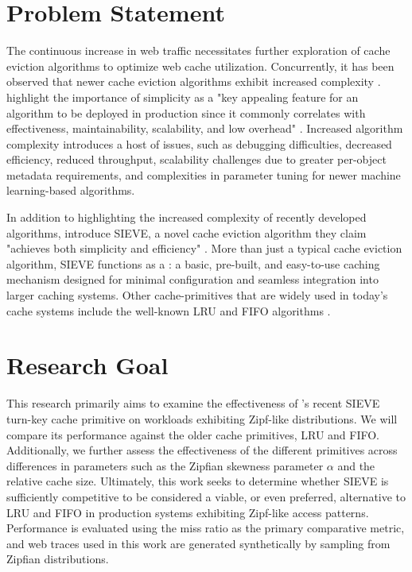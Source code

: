 \section{Problem Statement}



The continuous increase in web traffic \cite{digital-global-report} necessitates further exploration of cache eviction algorithms to optimize web cache utilization. Concurrently, it has been observed that newer cache eviction algorithms exhibit increased complexity \cite{sieve, s3-fifo}. \citeauthor{sieve} highlight the importance of simplicity as a "key appealing feature for an algorithm to be deployed in production since it commonly correlates with effectiveness, maintainability, scalability, and low overhead" \cite{sieve}. Increased algorithm complexity introduces a host of issues, such as debugging difficulties, decreased efficiency, reduced throughput, scalability challenges due to greater per-object metadata requirements, and complexities in parameter tuning for newer machine learning-based algorithms.

In addition to highlighting the increased complexity of recently developed algorithms, \citeauthor{sieve} introduce SIEVE, a novel cache eviction algorithm they claim "achieves both simplicity and efficiency" \cite{sieve}. More than just a typical cache eviction algorithm, SIEVE functions as a : a basic, pre-built, and easy-to-use caching mechanism designed for minimal configuration and seamless integration into larger caching systems. Other cache-primitives that are widely used in today's cache systems include the well-known LRU and FIFO algorithms \cite{sieve, s3-fifo}.


\section{Research Goal}\label{sec: research_q}


This research primarily aims to examine the effectiveness of \citeauthor{sieve}'s recent SIEVE turn-key cache primitive on workloads exhibiting Zipf-like distributions. We will compare its performance against the older cache primitives, LRU and FIFO. Additionally, we further assess the effectiveness of the different primitives across differences in parameters such as the Zipfian skewness parameter $\alpha$ and the relative cache size. Ultimately, this work seeks to determine whether SIEVE is sufficiently competitive to be considered a viable, or even preferred, alternative to LRU and FIFO in production systems exhibiting Zipf-like access patterns. Performance is evaluated using the miss ratio as the primary comparative metric, and web traces used in this work are generated synthetically by sampling from Zipfian distributions.


